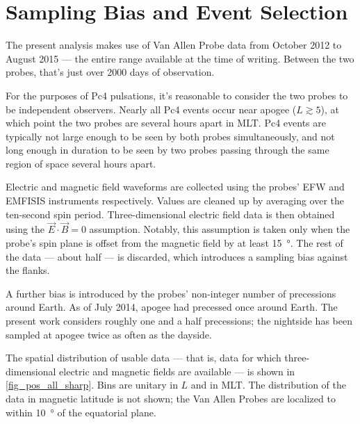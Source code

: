 \section{Sampling Bias and Event Selection}
  \label{sec_selection}

The present analysis makes use of Van Allen Probe data from October 2012 to
August 2015 --- the entire range available at the time of writing. Between the
two probes, that's just over 2000 days of observation. 

For the purposes of Pc4 pulsations, it's reasonable to consider the two probes
to be independent observers. Nearly all Pc4 events occur near apogee
($L \gtrsim 5$), at which point the two probes are several hours apart in MLT.
Pc4 events are typically not large enough to be seen by both probes
simultaneously, and not long enough in duration to be seen by two probes
passing through the same region of space several hours apart. 


Electric and magnetic field waveforms are collected using the probes'
EFW\cite{wygant_2013} and EMFISIS instruments respectively. Values are cleaned
up by averaging over the ten-second spin period. Three-dimensional electric
field data is then obtained using the $\vec{E} \cdot \vec{B} = 0$ assumption.
Notably, this assumption is taken only when the probe's spin plane is offset
from the magnetic field by at least \SI{15}{\degree}. The rest of the data ---
about half --- is discarded, which introduces a sampling bias against the
flanks.

A further bias is introduced by the probes' non-integer number of precessions
around Earth. As of July 2014, apogee had precessed once around
Earth\cite{dai_2015}. The present work considers roughly one and a half
precessions; the nightside has been sampled at apogee twice as often as the
dayside. 

The spatial distribution of usable data --- that is, data for which
three-dimensional electric and magnetic fields are available --- is shown in
\cref{fig_pos_all_sharp}. Bins are unitary in $L$ and in MLT. The distribution
of the data in magnetic latitude is not shown; the Van Allen Probes are
localized to within \about\SI{10}{\degree} of the equatorial plane. 

